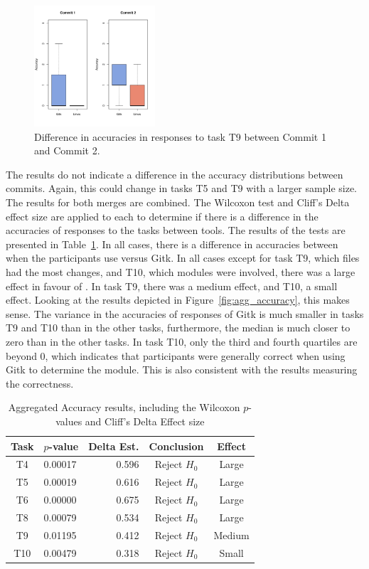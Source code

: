 \begin{figure}[htpb]
  \centering
  \includegraphics[height=4.5cm]{Figures/evaluation/accuracy/9.pdf}
  \caption{Difference in accuracies in responses to task T9 between Commit 1 and Commit 2.}
  \label{fig:cross_commit_T9_accuracy}
\end{figure}

The results do not indicate a difference in the accuracy distributions
between commits. Again, this could change in tasks T5 and T9 with a
larger sample size. The results for both merges are combined. The
Wilcoxon test and Cliff's Delta effect size are applied to each to
determine if there is a difference in the accuracies of responses to the
tasks between tools. The results of the tests are presented in
Table~\ref{tab:accuracy_results}. In all cases, there is a difference
in accuracies between when the participants use \tool{} versus Gitk. In
all cases except for task T9, which files had the most changes, and T10,
which modules were involved, there was a large effect in favour of
\tool{}. In task T9, there was a medium effect, and T10, a small effect.
Looking at the results depicted in Figure~\ref{fig:agg_accuracy}, this
makes sense. The variance in the accuracies of responses of Gitk is much
smaller in tasks T9 and T10 than in the other tasks, furthermore, the
median is much closer to zero than in the other tasks. In task T10, only
the third and fourth quartiles are beyond 0, which indicates that
participants were generally correct when using Gitk to determine the
module. This is also consistent with the results measuring the
correctness.

\begin{table}[htpb]
  \centering
  \caption{Aggregated Accuracy results, including the Wilcoxon
    $p$-values and Cliff's Delta Effect size}
  \label{tab:accuracy_results}
  \begin{tabular}{clrcc}
    \toprule
    Task & $p$-value & Delta Est. & Conclusion   & Effect\\\midrule
    T4   & 0.00017   & 0.596      & Reject $H_0$ & Large\\
    T5   & 0.00019   & 0.616      & Reject $H_0$ & Large\\
    T6   & 0.00000   & 0.675      & Reject $H_0$ & Large\\
    T8   & 0.00079   & 0.534      & Reject $H_0$ & Large\\
    T9   & 0.01195   & 0.412      & Reject $H_0$ & Medium\\
    T10  & 0.00479   & 0.318      & Reject $H_0$ & Small\\
    \bottomrule
  \end{tabular}
\end{table}

